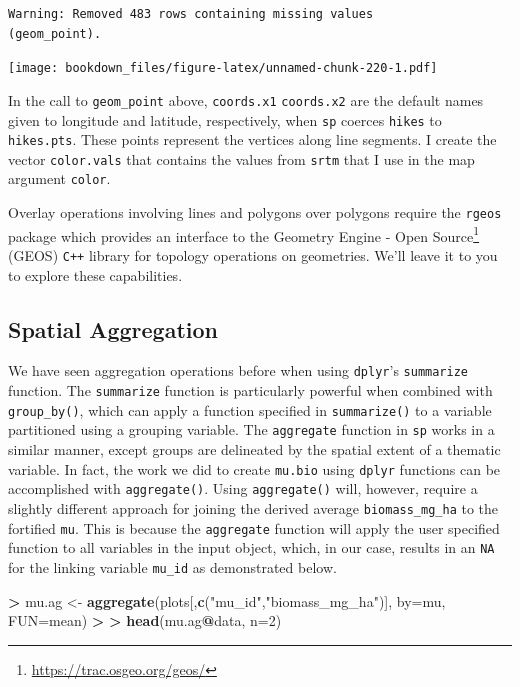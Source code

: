 \documentclass[]{krantz}
\makeatletter
\newenvironment{Shaded}{\begin{snugshade}}{\end{snugshade}}
\newcommand{\KeywordTok}[1]{\textcolor[rgb]{0.27,0.27,0.27}{\textbf{#1}}}
\newcommand{\DataTypeTok}[1]{\textcolor[rgb]{0.27,0.27,0.27}{#1}}
\newcommand{\DecValTok}[1]{\textcolor[rgb]{0.06,0.06,0.06}{#1}}
\newcommand{\StringTok}[1]{\textcolor[rgb]{0.5,0.5,0.5}{#1}}
\newcommand{\OperatorTok}[1]{\textcolor[rgb]{0.43,0.43,0.43}{\textbf{#1}}}
\newcommand{\ErrorTok}[1]{\textcolor[rgb]{0.14,0.14,0.14}{\textbf{#1}}}
\newcommand{\NormalTok}[1]{#1}
\renewcommand{\href}[2]{#2\footnote{\url{#1}}}
\newenvironment{kframe}{%
\medskip{}
\setlength{\fboxsep}{.8em}
 \def\at@end@of@kframe{}%
 \ifinner\ifhmode%
  \def\at@end@of@kframe{\end{minipage}}%
  \begin{minipage}{\columnwidth}%
 \fi\fi%
 \def\FrameCommand##1{\hskip\@totalleftmargin \hskip-\fboxsep
 \colorbox{shadecolor}{##1}\hskip-\fboxsep
     \hskip-\linewidth \hskip-\@totalleftmargin \hskip\columnwidth}%
 \MakeFramed {\advance\hsize-\width
   \@totalleftmargin\z@ \linewidth\hsize
   \@setminipage}}%
 {\par\unskip\endMakeFramed%
 \at@end@of@kframe}
\renewenvironment{Shaded}{\begin{kframe}}{\end{kframe}}
\makeatother
\begin{document}
\begin{verbatim}
Warning: Removed 483 rows containing missing values
(geom_point).
\end{verbatim}

\texttt{[image: bookdown\_files/figure-latex/unnamed-chunk-220-1.pdf]}

In the call to \texttt{geom\_point} above, \texttt{coords.x1}
\texttt{coords.x2} are the default names given to longitude and
latitude, respectively, when \texttt{sp} coerces \texttt{hikes} to
\texttt{hikes.pts}. These points represent the vertices along line
segments. I create the vector \texttt{color.vals} that contains the
values from \texttt{srtm} that I use in the map argument \texttt{color}.

Overlay operations involving lines and polygons over polygons require
the \texttt{rgeos} package which provides an interface to the
\href{https://trac.osgeo.org/geos/}{Geometry Engine - Open Source}
(GEOS) \texttt{C++} library for topology operations on geometries. We'll
leave it to you to explore these capabilities.

\subsection{Spatial Aggregation}\label{spatial-aggregation}

We have seen aggregation operations before when using \texttt{dplyr}'s
\texttt{summarize} function. The \texttt{summarize} function is
particularly powerful when combined with \texttt{group\_by()}, which can
apply a function specified in \texttt{summarize()} to a variable
partitioned using a grouping variable. The \texttt{aggregate} function
in \texttt{sp} works in a similar manner, except groups are delineated
by the spatial extent of a thematic variable. In fact, the work we did
to create \texttt{mu.bio} using \texttt{dplyr} functions can be
accomplished with \texttt{aggregate()}. Using \texttt{aggregate()} will,
however, require a slightly different approach for joining the derived
average \texttt{biomass\_mg\_ha} to the fortified \texttt{mu}. This is
because the \texttt{aggregate} function will apply the user specified
function to all variables in the input object, which, in our case,
results in an \texttt{NA} for the linking variable \texttt{mu\_id} as
demonstrated below.

\begin{Shaded}
\begin{Highlighting}[]
\OperatorTok{>}\StringTok{ }\NormalTok{mu.ag <-}\StringTok{ }\KeywordTok{aggregate}\NormalTok{(plots[,}\KeywordTok{c}\NormalTok{(}\StringTok{"mu_id"}\NormalTok{,}\StringTok{"biomass_mg_ha"}\NormalTok{)], }\DataTypeTok{by=}\NormalTok{mu, }\DataTypeTok{FUN=}\NormalTok{mean)}
\OperatorTok{>}\StringTok{ }
\ErrorTok{>}\StringTok{ }\KeywordTok{head}\NormalTok{(mu.ag}\OperatorTok{@}\NormalTok{data, }\DataTypeTok{n=}\DecValTok{2}\NormalTok{)}
\end{Highlighting}
\end{Shaded}
\end{document}
